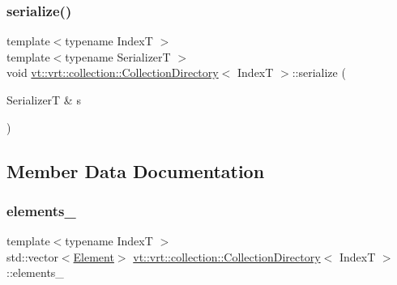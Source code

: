 \subsubsection{\texorpdfstring{serialize()}{serialize()}}
{\footnotesize\ttfamily template$<$typename IndexT $>$ \\
template$<$typename SerializerT $>$ \\
void \hyperlink{structvt_1_1vrt_1_1collection_1_1_collection_directory}{vt\+::vrt\+::collection\+::\+Collection\+Directory}$<$ IndexT $>$\+::serialize (\begin{DoxyParamCaption}\item[{SerializerT \&}]{s }\end{DoxyParamCaption})\hspace{0.3cm}{\ttfamily [inline]}}



\subsection{Member Data Documentation}
\mbox{\label{structvt_1_1vrt_1_1collection_1_1_collection_directory_abd9de4d084eb8cf4206c4729af70f734}} 
\subsubsection{\texorpdfstring{elements\+\_\+}{elements\_}}
{\footnotesize\ttfamily template$<$typename IndexT $>$ \\
std\+::vector$<$\hyperlink{structvt_1_1vrt_1_1collection_1_1_collection_directory_1_1_element}{Element}$>$ \hyperlink{structvt_1_1vrt_1_1collection_1_1_collection_directory}{vt\+::vrt\+::collection\+::\+Collection\+Directory}$<$ IndexT $>$\+::elements\+\_\+}

\mbox{\label{structvt_1_1vrt_1_1collection_1_1_collection_directory_a1d475a0d988698b91aaaabef7bb5c452}} 
